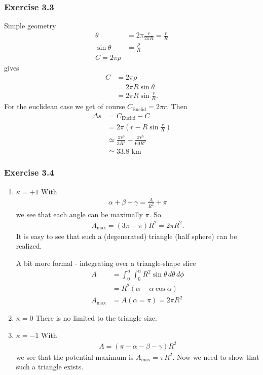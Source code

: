 \documentclass[10pt,a4paper]{book}
\theoremstyle{definition}
\begin{document}
\subsubsection{Exercise 3.3}
Simple geometry
\begin{align}
\theta&=2\pi\frac{r}{2\pi R}=\frac{r}{R}\\
\sin\theta&=\frac{\rho}{R}\\
C=2\pi\rho
\end{align}
gives
\begin{align}
C&=2\pi\rho\\
&=2\pi R \sin\theta\\
&=2\pi R \sin\frac{r}{R}.
\end{align}
For the euclidean case we get of course $C_\text{Euclid}=2\pi r$. Then
\begin{align}
\Delta s &= C_\text{Euclid}-C\\
&=2\pi (r-R \sin\frac{r}{R})\\
&\simeq\frac{\pi r^3}{3R^2}-\frac{\pi r^5}{60R^2}\\
&\simeq33.8\text{ km}
\end{align}

\subsubsection{Exercise 3.4}
\begin{enumerate}
\item $\kappa=+1$
With
\begin{align}
\alpha+\beta+\gamma=\frac{A}{R^2}+\pi
\end{align}
we see that each angle can be maximally $\pi$. So
\begin{align}
A_{\max}=(3\pi-\pi)R^2=2\pi R^2.
\end{align}
It is easy to see that such a (degenerated) triangle (half sphere) can be realized. 

A bit more formal - integrating over a triangle-shape slice
\begin{align}
A&=\int_0^\alpha\int_0^\alpha R^2\sin\theta\,d\theta\,d\phi\\
&=R^2(\alpha-\alpha\cos\alpha)\\
A_\text{max}&=A(\alpha=\pi)=2\pi R^2
\end{align}

\item $\kappa=0$
There is no limited to the triangle size.


\item $\kappa=-1$
With
\begin{align}
A=(\pi-\alpha-\beta-\gamma)R^2
\end{align}
we see that the potential maximum is $A_\text{max}=\pi R^2$. Now we need to show that such a triangle exists.

\end{enumerate}
\end{document}
